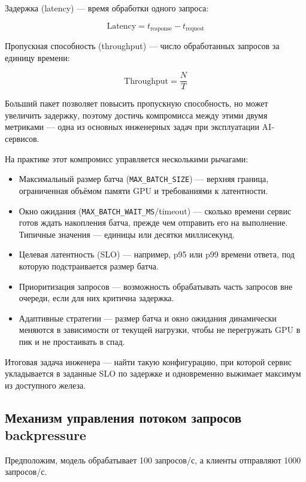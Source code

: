 \documentclass[12pt,a4paper]{article}
\begin{document}
Задержка (latency) — время обработки одного запроса:

\begin{equation}
\text{Latency} = t_{\text{response}} - t_{\text{request}}
\end{equation}

Пропускная способность (throughput) — число обработанных запросов за единицу времени:

\begin{equation}
\text{Throughput} = \frac{N}{T}
\end{equation}

Больший пакет позволяет повысить пропускную способность, но может увеличить задержку, поэтому достичь компромисса между этими двумя метриками — одна из основных инженерных задач при эксплуатации AI-сервисов.

На практике этот компромисс управляется несколькими рычагами:

\begin{itemize}
    \item Максимальный размер батча (\texttt{MAX\_BATCH\_SIZE}) — верхняя граница, ограниченная объёмом памяти GPU и требованиями к латентности.
    \item Окно ожидания (\texttt{MAX\_BATCH\_WAIT\_MS}/timeout) — сколько времени сервис готов ждать накопления батча, прежде чем отправить его на выполнение. Типичные значения — единицы или десятки миллисекунд.
    \item Целевая латентность (SLO) — например, p95 или p99 времени ответа, под которую подстраивается размер батча.
    \item Приоритизация запросов — возможность обрабатывать часть запросов вне очереди, если для них критична задержка.
    \item Адаптивные стратегии — размер батча и окно ожидания динамически меняются в зависимости от текущей нагрузки, чтобы не перегружать GPU в пик и не простаивать в спад.
\end{itemize}

Итоговая задача инженера — найти такую конфигурацию, при которой сервис укладывается в заданные SLO по задержке и одновременно выжимает максимум из доступного железа.

\subsection{Механизм управления потоком запросов backpressure}

Предположим, модель обрабатывает 100 запросов/с, а клиенты отправляют 1000 запросов/с.
\end{document}
